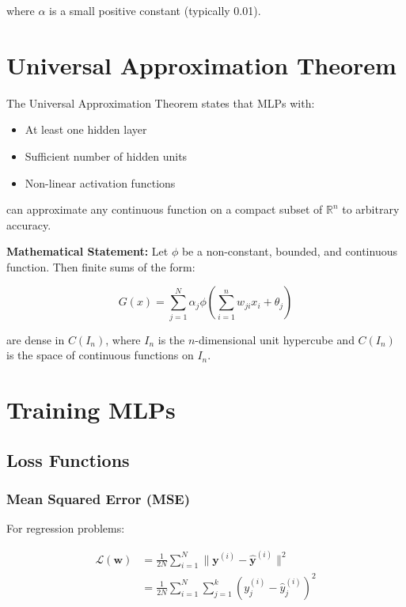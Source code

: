 \documentclass{article}
\begin{document}
where $\alpha$ is a small positive constant (typically 0.01).

\section{Universal Approximation Theorem}

The Universal Approximation Theorem states that MLPs with:
\begin{itemize}
    \item At least one hidden layer
    \item Sufficient number of hidden units
    \item Non-linear activation functions
\end{itemize}

can approximate any continuous function on a compact subset of $\mathbb{R}^n$ to arbitrary accuracy.

\textbf{Mathematical Statement:}
Let $\phi$ be a non-constant, bounded, and continuous function. Then finite sums of the form:

\begin{equation}
G(x) = \sum_{j=1}^{N} \alpha_j \phi\left(\sum_{i=1}^{n} w_{ji} x_i + \theta_j\right)
\end{equation}

are dense in $C(I_n)$, where $I_n$ is the $n$-dimensional unit hypercube and $C(I_n)$ is the space of continuous functions on $I_n$.

\section{Training MLPs}

\subsection{Loss Functions}

\subsubsection{Mean Squared Error (MSE)}
For regression problems:

\begin{align}
\mathcal{L}(\boldsymbol{w}) &= \frac{1}{2N} \sum_{i=1}^{N} \|\boldsymbol{y}^{(i)} - \hat{\boldsymbol{y}}^{(i)}\|^2 \\
&= \frac{1}{2N} \sum_{i=1}^{N} \sum_{j=1}^{k} (y_j^{(i)} - \hat{y}_j^{(i)})^2
\end{align}
\end{document}
